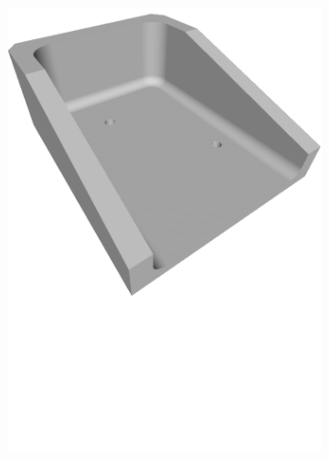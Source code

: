 \begin{figure}[h!]
{\begin{tcolorbox}
\begin{subfigure}[c]{.23\textwidth}
         \includegraphics[trim={0cm 9cm 0cm 0cm},clip,width=1\linewidth,angle=0]{Cap5/Figuras/objects/single_side_bracket.pdf}
         \caption{}
         \label{fig:single_side_bracket}
      \end{subfigure}
      \hfill
      \begin{subfigure}[c]{.23\textwidth}
         \centering

\end{subfigure}
\end{tcolorbox}}
\end{figure}
